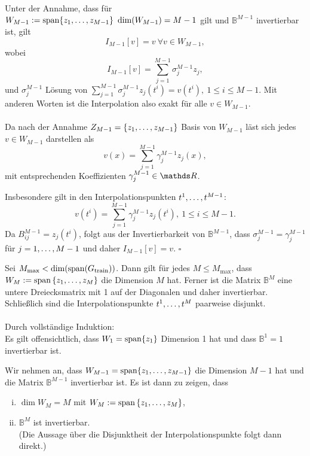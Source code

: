 Unter der Annahme, dass für $W_{M-1} := \operatorname{span} \{z_1, \dots ,z_{M-1}\} ~ \dim (W_{M-1}) = M-1$ gilt und $\mathbb{B}^{M-1}$ invertierbar ist, gilt 
\[
I_{M-1}[v] = v ~\forall v\in W_{M-1},
\]
wobei 
\[
I_{M-1}[v] = \sum_{j=1}^{M-1} \sigma_j^{M-1} z_j,
\]
und $\sigma_j^{M-1}$ Lösung von $\sum_{j=1}^{M-1} \sigma_j^{M-1} z_j(t^i) = v(t^i),~1\le i\le M-1$.
Mit anderen Worten ist die Interpolation also exakt für alle $v\in W_{M-1}$.\\

\\
Da nach der Annahme $Z_{M-1} = \left\{z_1, \dots ,z_{M-1}\right\}$ Basis von $W_{M-1}$ läst sich jedes $v\in W_{M-1}$ darstellen als
\[
v(x) = \sum_{j=1}^{M-1} \gamma_j^{M-1} z_j(x),
\]
mit entsprechenden Koeffizienten $\gamma_j^{M-1}\in \R$.

Insbesondere gilt in den Interpolationspunkten $t^1, \dots ,t^{M-1}$:
\[
v(t^i) = \sum_{j=1}^{M-1} \gamma_j^{M-1} z_j(t^i),~ 1\le i \le M-1.
\]
Da $B_{ij}^{M-1} = z_j(t^i)$, folgt aus der Invertierbarkeit von $\mathbb{B}^{M-1}$, dass $\sigma_j^{M-1}=\gamma_j^{M-1}$ für $j=1, \dots ,M-1$ und daher $I_{M-1}[v]=v$.
\hfill $\square$

Sei $M_{\max}< \dim(\operatorname{span} (G_{\operatorname{train}}))$.
Dann gilt für jedes $M\le M_{\max}$, dass $W_M:=\operatorname{span}\left\{z_1, \dots ,z_M\right\}$ die Dimension $M$ hat.
Ferner ist die Matrix $\mathbb{B}^M$ eine untere Dreiecksmatrix mit 1 auf der Diagonalen und daher invertierbar.
Schließlich sind die Interpolationspunkte $t^1, \dots ,t^M$ paarweise disjunkt.\\

\\
Durch vollständige Induktion:\\
Es gilt offensichtlich, dass $W_1=\operatorname{span}\{z_1\}$ Dimension 1 hat und dass $\mathbb{B}^1=1$ invertierbar ist.

Wir nehmen an, dass $W_{M-1} = \operatorname{span}\{z_1, \dots ,z_{M-1}\}$ die Dimension $M-1$ hat und die Matrix $\mathbb{B}^{M-1}$ invertierbar ist.
Es ist dann zu zeigen, dass
\begin{enumerate}[(i)]
	\item $\dim W_M = M$ mit $W_M:=\operatorname{span}\left\{z_1, \dots ,z_M\right\}$,
	\item $\mathbb{B}^M$ ist invertierbar.\\
	(Die Aussage über die Disjunktheit der Interpolationspunkte folgt dann direkt.)
\end{enumerate}

